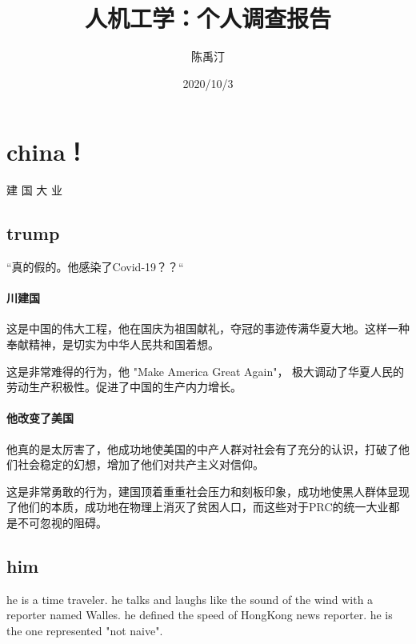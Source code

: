 \documentclass[UTF8]{ctexart}
\title{人机工学：个人调查报告}
\author{陈禹汀}
\date{2020/10/3}
\begin{document}
\maketitle%

\tableofcontents%

\section{china！}
    建 国 大 业
\subsection{trump}
    “真的假的。他感染了Covid-19？？“
\paragraph{川建国}
    这是中国的伟大工程，他在国庆为祖国献礼，夺冠的事迹传满华夏大地。这样一种奉献精神，是切实为中华人民共和国着想。

    这是非常难得的行为，他 "Make America Great Again"， 极大调动了华夏人民的劳动生产积极性。促进了中国的生产内力增长。
\paragraph{他改变了美国}
    他真的是太厉害了，他成功地使美国的中产人群对社会有了充分的认识，打破了他们社会稳定的幻想，增加了他们对共产主义对信仰。

    这是非常勇敢的行为，建国顶着重重社会压力和刻板印象，成功地使黑人群体显现了他们的本质，成功地在物理上消灭了贫困人口，而这些对于PRC的统一大业都是不可忽视的阻碍。
\subsection{him}
    he is a time traveler. he talks and laughs like the sound of the wind with a reporter named Walles. he defined the speed of HongKong news reporter. he is the one represented "not naive".
\end{document}
